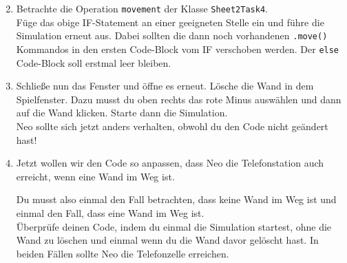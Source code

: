 \begin{enumerate} \setcounter{enumi}{1}
    \item Betrachte die Operation \lstinline{movement} der Klasse \lstinline{Sheet2Task4}.\\
    Füge das obige IF-Statement an einer geeigneten Stelle ein und führe die Simulation erneut aus.
    Dabei sollten die dann noch vorhandenen \lstinline{.move()} Kommandos in den ersten Code-Block vom IF verschoben werden.
    Der \lstinline{else} Code-Block soll erstmal leer bleiben.
    \item Schließe nun das Fenster und öffne es erneut.
    Lösche die Wand in dem Spielfenster.
    Dazu musst du oben rechts das rote Minus auswählen und dann auf die Wand klicken.
    Starte dann die Simulation.\\
    Neo sollte sich jetzt anders verhalten, obwohl du den Code nicht geändert hast!
    \item Jetzt wollen wir den Code so anpassen, dass Neo die Telefonstation auch erreicht, wenn eine Wand im Weg ist.
    
    Du musst also einmal den Fall betrachten, dass keine Wand im Weg ist und einmal den Fall, dass eine Wand im Weg ist.\\
    
    Überprüfe deinen Code, indem du einmal die Simulation startest, ohne die Wand zu löschen und einmal wenn du die Wand davor gelöscht hast.
    In beiden Fällen sollte Neo die Telefonzelle erreichen.

\end{enumerate}
